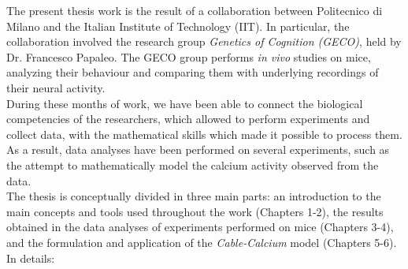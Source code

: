 \documentclass[12pt, a4paper]{report}
\begin{document}
	The present thesis work is the result of a collaboration between Politecnico di Milano and the Italian Institute of Technology (IIT). In particular, the collaboration involved the research group  \textit{Genetics of Cognition (GECO)}, held by Dr. Francesco Papaleo. The GECO group performs \textit{in vivo} studies on mice, analyzing their behaviour and comparing them with underlying recordings of their neural activity.\\
	During these months of work, we have been able to connect the biological competencies of the researchers, which allowed to perform experiments and collect data, with the mathematical skills which made it possible to process them. As a result, data analyses have been performed on several experiments, such as  the attempt to mathematically model the  calcium activity observed from the data.\\
	The  thesis is conceptually divided in three main parts: an introduction to the main concepts and tools used throughout the work (Chapters 1-2), the results obtained in the data analyses of experiments performed on mice (Chapters 3-4), and the formulation and application of the \textit{Cable-Calcium} model (Chapters 5-6). In details:
	
\end{document}
